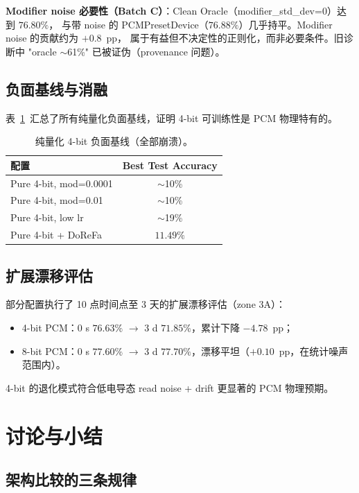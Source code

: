 \textbf{Modifier noise 必要性（Batch C）}：Clean Oracle（modifier\_std\_dev=0）达到 $76.80\%$，
与带 noise 的 PCMPresetDevice（$76.88\%$）几乎持平。Modifier noise 的贡献约为 $+0.8$~pp，
属于有益但不决定性的正则化，而非必要条件。旧诊断中 "oracle $\sim$61\%" 已被证伪（provenance 问题）。

\subsection{负面基线与消融}

表~\ref{tab:pcm-negative}~汇总了所有纯量化负面基线，证明 4-bit 可训练性是 PCM 物理特有的。

\begin{table}[htbp]
\centering
\caption{纯量化 4-bit 负面基线（全部崩溃）。}
\label{tab:pcm-negative}
\begin{tabular}{@{}lc@{}}
\toprule
\textbf{配置} & \textbf{Best Test Accuracy} \\
\midrule
Pure 4-bit, mod=0.0001 & $\sim$10\% \\
Pure 4-bit, mod=0.01   & $\sim$10\% \\
Pure 4-bit, low lr     & $\sim$19\% \\
Pure 4-bit + DoReFa    & $11.49\%$ \\
\bottomrule
\end{tabular}
\end{table}

\subsection{扩展漂移评估}

部分配置执行了 10 点时间点至 3 天的扩展漂移评估（zone 3A）：
\begin{itemize}
    \item 4-bit PCM：0 s $76.63\%$ $\to$ 3 d $71.85\%$，累计下降 $-4.78$~pp；
    \item 8-bit PCM：0 s $77.60\%$ $\to$ 3 d $77.70\%$，漂移平坦（$+0.10$~pp，在统计噪声范围内）。
\end{itemize}
4-bit 的退化模式符合低电导态 read noise + drift 更显著的 PCM 物理预期。

\section{讨论与小结}

\subsection{架构比较的三条规律}

